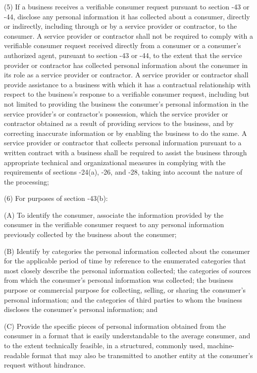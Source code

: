      (5)  If a business receives a verifiable consumer request pursuant to section    -43 or    -44, disclose any personal information it has collected about a consumer, directly or indirectly, including through or by a service provider or contractor, to the consumer.  A service provider or contractor shall not be required to comply with a verifiable consumer request received directly from a consumer or a consumer's authorized agent, pursuant to section    -43 or    -44, to the extent that the service provider or contractor has collected personal information about the consumer in its role as a service provider or contractor.  A service provider or contractor shall provide assistance to a business with which it has a contractual relationship with respect to the business's response to a verifiable consumer request, including but not limited to providing the business the consumer's personal information in the service provider's or contractor's possession, which the service provider or contractor obtained as a result of providing services to the business, and by correcting inaccurate information or by enabling the business to do the same.  A service provider or contractor that collects personal information pursuant to a written contract with a business shall be required to assist the business through appropriate technical and organizational measures in complying with the requirements of sections    -24(a),    -26, and    ‑28, taking into account the nature of the processing;

     (6)  For purposes of section    -43(b):

          (A)  To identify the consumer, associate the information provided by the consumer in the verifiable consumer request to any personal information previously collected by the business about the consumer;

          (B)  Identify by categories the personal information collected about the consumer for the applicable period of time by reference to the enumerated categories that most closely describe the personal information collected; the categories of sources from which the consumer's personal information was collected; the business purpose or commercial purpose for collecting, selling, or sharing the consumer's personal information; and the categories of third parties to whom the business discloses the consumer's personal information; and

          (C)  Provide the specific pieces of personal information obtained from the consumer in a format that is easily understandable to the average consumer, and to the extent technically feasible, in a structured, commonly used, machine-readable format that may also be transmitted to another entity at the consumer's request without hindrance.

